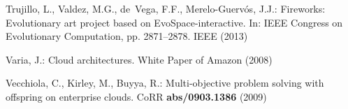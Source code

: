 \begin{thebibliography}{10}
Trujillo, L., Valdez, M.G., de~Vega, F.F., Merelo-Guerv\'os, J.J.: {Fireworks:
  Evolutionary art project based on EvoSpace-interactive}.
\newblock In: IEEE Congress on Evolutionary Computation, pp. 2871--2878. IEEE
  (2013)

Varia, J.: Cloud architectures.
\newblock White Paper of Amazon  (2008)

Vecchiola, C., Kirley, M., Buyya, R.: Multi-objective problem solving with
  offspring on enterprise clouds.
\newblock CoRR \textbf{abs/0903.1386} (2009)

\end{thebibliography}








